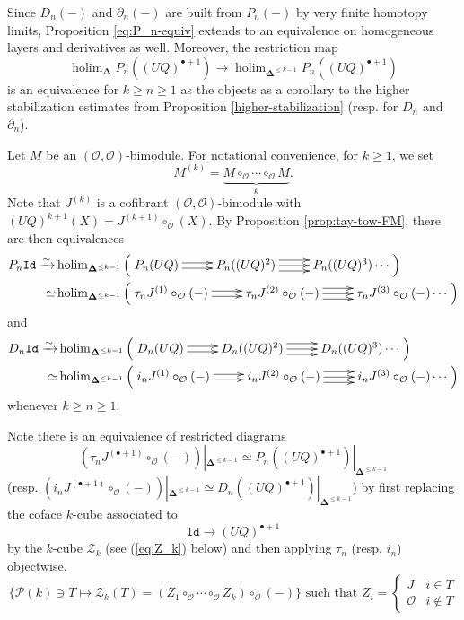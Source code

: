\documentclass[11pt]{amsart}
\theoremstyle{definition}
\theoremstyle{remark}
\newcommand{\holim}{\operatorname{holim}}
\newcommand{\Id}{\mathtt{Id}}
\newcommand{\Cal}[1]{\mathcal{#1}}
\newcommand{\bdel}{\mathbf{\Delta}}
\begin{document}
Since $D_n(-)$ and $\partial_n(-)$ are built from $P_n(-)$ by very finite homotopy limits, Proposition \ref{eq:P_n-equiv} extends to an equivalence on homogeneous layers and derivatives as well. Moreover, the restriction map \[\holim_{\bdel} P_n((UQ)^{\bullet+1})\to \holim_{\bdel^{\leq k-1}} P_n ((UQ)^{\bullet+1})\] 
is an equivalence for $k\geq n\geq1$ as the objects as a corollary to the higher stabilization estimates from Proposition \ref{higher-stabilization} (resp. for $D_n$ and $\partial_n$). 

Let $M$ be an $(\Cal{O}, \Cal{O})$-bimodule. For notational convenience, for $k\geq 1$, we set \begin{equation} \label{eq:Mcirck} 
    M^{(k)} = \underbrace{M\circ_{\Cal{O}} \cdots \circ_{\Cal{O}} M}_k.
    \end{equation} Note that $J^{(k)}$ is a cofibrant $(\Cal{O}, \Cal{O})$-bimodule with $(UQ)^{k+1}(X)= J^{(k+1)}\circ_{\Cal{O}} (X)$. By Proposition \ref{prop:tay-tow-FM}, there are then equivalences  \begin{align*}
    P_n \Id \xrightarrow{\sim} & \holim_{\bdel^{\leq k-1}} \left( \xymatrix{
    P_n (UQ) \ar@<-.5ex>[r] \ar@<.5ex>[r] &
    P_n ((UQ)^2) \ar@<-1ex>[r] \ar[r] \ar@<1ex>[r] & 
    P_n ((UQ)^3) \cdots
    }\right)\\
      \simeq & \holim_{\bdel^{\leq k-1}} \left(\xymatrix{ 
    \tau_n J^{(1)}\circ_{\Cal{O}}(-) \ar@<.5 ex>[r] \ar@<-.5ex>[r] &
    \tau_n J^{(2)} \circ_{\Cal{O}}(-) \ar@<1 ex>[r] \ar[r] \ar@<-1 ex>[r] &
    \tau_n J^{(3)} \circ_{\Cal{O}}(-) \cdots }\right) 
\end{align*}
and \begin{align*}
    D_n \Id \xrightarrow{\sim} & \holim_{\bdel^{\leq k-1}} \left( \xymatrix{
    D_n (UQ) \ar@<-.5ex>[r] \ar@<.5ex>[r] &
    D_n ((UQ)^2)  \ar@<-1ex>[r] \ar[r] \ar@<1ex>[r] & 
    D_n ((UQ)^3) \cdots
    }\right) \\
     \simeq & \holim_{\bdel^{\leq k-1}} \left(\xymatrix{ 
    i_n J^{(1)}\circ_{\Cal{O}}(-) \ar@<.5 ex>[r] \ar@<-.5ex>[r] &
    i_n J^{(2)} \circ_{\Cal{O}}(-) \ar@<1 ex>[r] \ar[r] \ar@<-1 ex>[r] &
    i_n J^{(3)} \circ_{\Cal{O}}(-) \cdots }\right)
\end{align*}
whenever $k\geq n\geq 1$. 

Note there is an equivalence of restricted diagrams \[(\tau_n J^{(\bullet+1)}\circ_{\Cal{O}}(-) )|_{\bdel^{\leq k-1}} \simeq P_n((UQ)^{\bullet+1})|_{\bdel^{\leq k-1}}\] (resp. $(i_n J^{(\bullet+1)}\circ_{\Cal{O}}(-))|_{\bdel^{\leq k-1}} \simeq D_n((UQ)^{\bullet+1})|_{\bdel^{\leq k-1}}$) by first replacing the coface $k$-cube associated to \[\Id \to (UQ)^{\bullet+1}\] by the $k$-cube $\Cal{Z}_k$ (see (\ref{eq:Z_k}) below) and then applying $\tau_n$ (resp. $i_n$) objectwise. \begin{equation} \label{eq:Z_k} \{\Cal{P}(k) \ni T \mapsto \Cal{Z}_k(T) = (Z_1 \circ_{\Cal{O}} \cdots \circ_{\Cal{O}} Z_k) \circ_{\Cal{O}} (-) \}  \text{ such that $Z_i=\begin{cases} J & i\in T \\ \Cal{O} & i \notin T \end{cases}$} \end{equation} 
\end{document}
